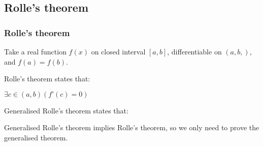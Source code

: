 
\subsection{Rolle's theorem}

\subsubsection{Rolle’s theorem}

Take a real function \(f(x)\) on closed interval \([a,b]\), differentiable on \((a,b,)\), and \(f(a)=f(b)\).

Rolle’s theorem states that:

$\exists c\in(a,b) (f’(c)=0)$

Generalised Rolle’s theorem states that:

Generalised Rolle’s theorem implies Rolle’s theorem, so we only need to prove the generalised theorem.

